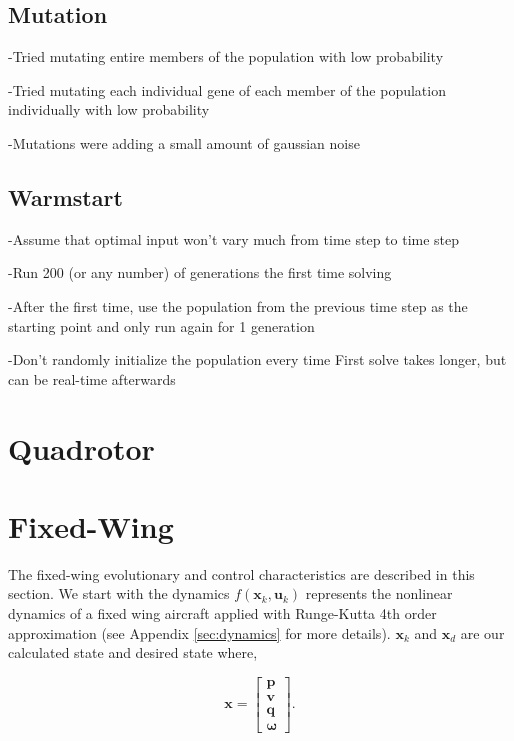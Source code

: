 \documentclass[letterpaper, 10 pt, conference]{ieeeconf}  %
\begin{document}
\subsection{Mutation}

-Tried mutating entire members of the population with low probability

-Tried mutating each individual gene of each member of the population individually with low probability

-Mutations were adding a small amount of gaussian noise


\subsection{Warmstart}

-Assume that optimal input won’t vary much from time step to time step

-Run 200 (or any number) of generations the first time solving

-After the first time, use the population from the previous time step as the starting point and only run again for 1 generation

-Don’t randomly initialize the population every time
First solve takes longer, but can be real-time afterwards


\section{Quadrotor}
\label{subsub:quad}

\section{Fixed-Wing}
\label{subsub:fw}

The fixed-wing evolutionary and control characteristics are described in this section. We start with the dynamics $f(\mathbf{x}_k,\mathbf{u}_k)$ represents the nonlinear dynamics of a fixed wing aircraft applied with Runge-Kutta 4th order approximation (see Appendix \ref{sec:dynamics} for more details). $\mathbf{x}_k$ and $\mathbf{x}_{d}$ are our calculated state and desired state where,

\begin{equation}
\label{eq:lqr_current_desired_states}
\mathbf{x}=\begin{bmatrix}\mathbf{p} \\ \mathbf{v} \\ \mathbf{q} \\ \boldsymbol{\omega}\end{bmatrix}.
\end{equation}
\end{document}
